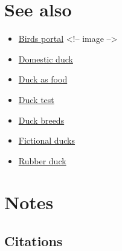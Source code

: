 \documentclass[11pt,a4paper]{article}
\begin{document}
\section{See also}

\begin{itemize}
\item \href{/wiki/Portal:Birds}{Birds portal}
<!-- image -->
\end{itemize}

\begin{itemize}
\item \href{/wiki/Domestic\_duck}{Domestic duck}
\item \href{/wiki/Duck\_as\_food}{Duck as food}
\item \href{/wiki/Duck\_test}{Duck test}
\item \href{/wiki/List\_of\_duck\_breeds}{Duck breeds}
\item \href{/wiki/List\_of\_fictional\_ducks}{Fictional ducks}
\item \href{/wiki/Rubber\_duck}{Rubber duck}
\end{itemize}

\section{Notes}

\subsection{Citations}
\end{document}
